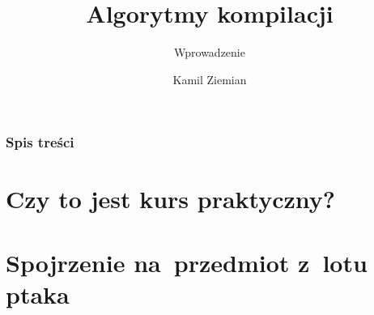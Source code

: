 \documentclass[10pt,t]{beamer}
\title{Algorytmy kompilacji}
\subtitle{Wprowadzenie}
\author{Kamil Ziemian}
\begin{document}





\RaggedRight





\maketitle





\begin{frame}
  \frametitle{Spis treści}


  \tableofcontents

\end{frame}





\section{Czy to jest kurs praktyczny?}







\section{Spojrzenie na~przedmiot z~lotu ptaka}







\end{document}
